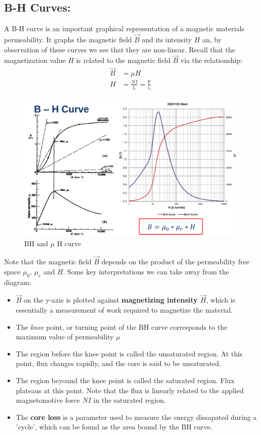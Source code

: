 \documentclass{book}
\begin{document}
\subsection{B-H Curves:}
A B-H curve is an important graphical representation of a magnetic materials permeability. It graphs the magnetic field $\vec{B}$ and its intensity $H$ an, by observation of these curves we see that they are non-linear. Recall that the magnetization value $H$ is related to the magnetic field $\vec{B}$ via the relationship:
\begin{align*}
	\vec{B} &= \mu H \\
	H &= \frac{NI}{l_c} = \frac{\mathsf{F}}{l_c}
\end{align*}
\begin{figure}[h]
	\centering
	\includegraphics[width=0.4\linewidth]{Screenshots/BH_curve}
	\caption{BH and $\mu$ H curve}
	\label{fig:bhcurve}
\end{figure}
 Note that the magnetic field $\vec{B}$ depends on the product of the permeability free space $\mu_0$, $\mu_r$ and $H$. Some key interpretations we can take away from the diagram:
 \begin{itemize}
 	\item  $\vec{B}$ on the y-axis is plotted against \textbf{magnetizing intensity $\vec{H}$}, which is essentially a measurement of work required to magnetize the material.
 	\item The \textit{knee} point, or turning point of the BH curve corresponds to the maximum value of permeability $\mu$
 	\item The region before the knee point is called the unsaturated region. At this point, flux changes rapidly, and the core is said to be unsaturated.
 	\item The region beyound the knee point is called the saturated region. Flux plateaus at this point. Note that the flux is linearly related to the applied magnetomotive force $NI$ in the saturated region.
 	\item The \textbf{core loss} is a parameter used to measure the energy dissapated during a 'cycle', which can be found as the area bound by the BH curve.
 \end{itemize}
	
\end{document}
